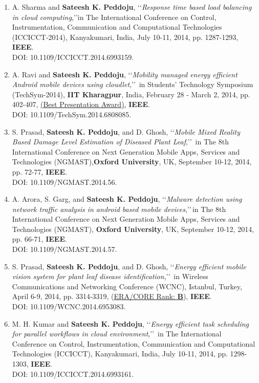 \begin{enumerate}
	\item
	A. Sharma and \textbf{Sateesh K. Peddoju}, \lq\lq \textit{Response time based load balancing in cloud computing},\rq\rq in The International Conference on Control, Instrumentation, Communication and Computational Technologies (ICCICCT-2014), Kanyakumari, India, July 10-11, 2014, pp. 1287-1293, \textbf{IEEE}. \\DOI: 10.1109/ICCICCT.2014.6993159.
	
	\item
	A. Ravi and \textbf{Sateesh K. Peddoju}, \lq\lq \textit{Mobility managed energy efficient Android mobile devices using cloudlet},\rq\rq\, in Students' Technology Symposium (TechSym-2014), \textbf{IIT Kharagpur}, India, February 28 - March 2, 2014, pp. 402-407, \underline{(Best Presentation Award)}, \textbf{IEEE}. \\DOI: 10.1109/TechSym.2014.6808085.
	
	\item
	S. Prasad, \textbf{Sateesh K. Peddoju}, and D. Ghosh, \lq\lq \textit{Mobile Mixed Reality Based Damage Level Estimation of Diseased Plant Leaf},\rq\rq\, in The 8th International Conference on Next Generation Mobile Apps, Services and Technologies (NGMAST),\textbf{Oxford University}, UK, September 10-12, 2014, pp. 72-77, \textbf{IEEE}. \\DOI: 10.1109/NGMAST.2014.56.
		
	\item
	A. Arora, S. Garg, and \textbf{Sateesh K. Peddoju}, \lq\lq \textit{Malware detection using network traffic analysis in android based mobile devices},\rq\rq\,in The 8th International Conference on Next Generation Mobile Apps, Services and Technologies (NGMAST), \textbf{Oxford University}, UK, September 10-12, 2014, pp. 66-71, \textbf{IEEE}. \\DOI: 10.1109/NGMAST.2014.57.
	
	\item
	S. Prasad, \textbf{Sateesh K. Peddoju}, and D. Ghosh, \lq\lq \textit{Energy efficient mobile vision system for plant leaf disease identification},\rq\rq\, in Wireless Communications and Networking Conference (WCNC), Istanbul, Turkey, April 6-9, 2014, pp. 3314-3319, (\underline{ERA/CORE Rank: \textbf{B}}), \textbf{IEEE}. \\DOI: 10.1109/WCNC.2014.6953083.
	
	\item
	M. H. Kumar and \textbf{Sateesh K. Peddoju}, \lq\lq \textit{Energy efficient task scheduling for parallel workflows in cloud environment},\rq\rq\, in The International Conference on Control, Instrumentation, Communication and Computational Technologies (ICCICCT), Kanyakumari, India, July 10-11, 2014, pp. 1298-1303, \textbf{IEEE}. 
\\DOI: 10.1109/ICCICCT.2014.6993161.
	

\end{enumerate}
